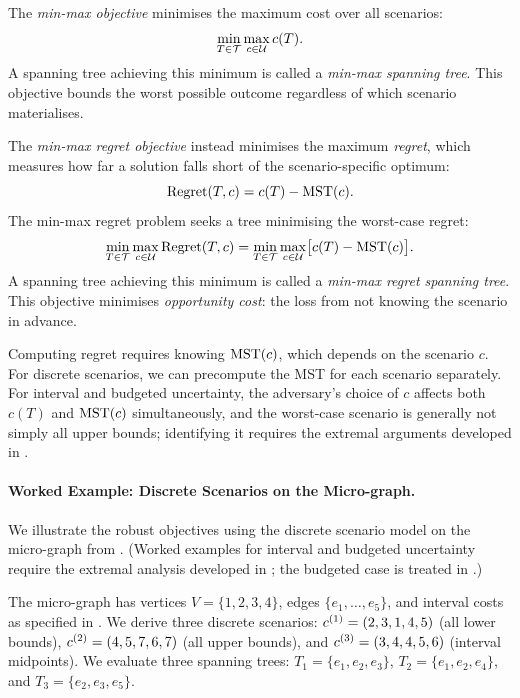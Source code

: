 The \emph{\textcolor{RWTHBlue}{min-max objective}} minimises the maximum cost over all scenarios:
\begin{equation}\label{eq:minmax-objective}
\min_{T \in \mathcal{T}} \max_{c \in \mathcal{U}} c(T).
\end{equation}
A spanning tree achieving this minimum is called a \emph{\textcolor{RWTHBlue}{min-max spanning tree}}.
This objective bounds the worst possible outcome regardless of which scenario materialises.

The \emph{\textcolor{RWTHBlue}{min-max regret objective}} instead minimises the maximum \emph{\textcolor{RWTHBlue}{regret}}, which measures how far a solution falls short of the scenario-specific optimum:
\begin{equation}\label{eq:regret-def}
\operatorname{Regret}(T,c) = c(T) - \mathrm{MST}(c).
\end{equation}
The min-max regret problem seeks a tree minimising the worst-case regret:
\begin{equation}\label{eq:minmax-regret-objective}
\min_{T \in \mathcal{T}} \max_{c \in \mathcal{U}} \operatorname{Regret}(T,c) = \min_{T \in \mathcal{T}} \max_{c \in \mathcal{U}} \bigl[c(T) - \mathrm{MST}(c)\bigr].
\end{equation}
A spanning tree achieving this minimum is called a \emph{\textcolor{RWTHBlue}{min-max regret spanning tree}}.
This objective minimises \emph{opportunity cost}: the loss from not knowing the scenario in advance.

Computing regret requires knowing $\mathrm{MST}(c)$, which depends on the scenario $c$.
For discrete scenarios, we can precompute the MST for each scenario separately.
For interval and budgeted uncertainty, the adversary's choice of $c$ affects both $c(T)$ and $\mathrm{MST}(c)$ simultaneously, and the worst-case scenario is generally not simply all upper bounds; identifying it requires the extremal arguments developed in .

\paragraph{Worked Example: Discrete Scenarios on the Micro-graph.}

We illustrate the robust objectives using the discrete scenario model on the micro-graph from .
(Worked examples for interval and budgeted uncertainty require the extremal analysis developed in ; the budgeted case is treated in .)

The micro-graph has vertices $V = \{1,2,3,4\}$, edges $\{e_1, \ldots, e_5\}$, and interval costs as specified in .
We derive three discrete scenarios:
$c^{(1)} = (2, 3, 1, 4, 5)$ (all lower bounds),
$c^{(2)} = (4, 5, 7, 6, 7)$ (all upper bounds), and
$c^{(3)} = (3, 4, 4, 5, 6)$ (interval midpoints).
We evaluate three spanning trees:
$T_1 = \{e_1, e_2, e_3\}$,
$T_2 = \{e_1, e_2, e_4\}$, and
$T_3 = \{e_2, e_3, e_5\}$.

